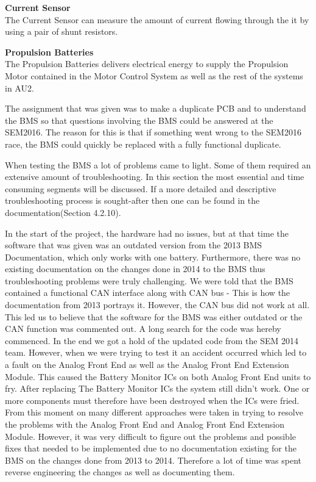 \textbf{Current Sensor}\\
The Current Sensor can measure the amount of current flowing through the it by using a pair of shunt resistors. 

\textbf{Propulsion Batteries}\\
The Propulsion Batteries delivers electrical energy to supply the Propulsion Motor contained in the Motor Control System as well as the rest of the systems in AU2.


The assignment that was given was to make a duplicate PCB and to understand the BMS so that questions involving the BMS could be answered at the SEM2016. The reason for this is that if something went wrong to the SEM2016 race, the BMS could quickly be replaced with a fully functional duplicate.

When testing the BMS a lot of problems came to light. Some of them required an extensive amount of troubleshooting. In this section the most essential and time consuming segments will be discussed. If a more detailed and descriptive troubleshooting process is sought-after then one can be found in the documentation\cite{AU2}(Section 4.2.10).

In the start of the project, the hardware had no issues, but at that time the software that was given was an outdated version from the 2013 BMS Documentation\cite{BMSDocumentation}, which only works with one battery. Furthermore, there was no existing documentation on the changes done in 2014 to the BMS thus troubleshooting problems were truly challenging.
We were told that the BMS contained a functional CAN interface along with CAN bus - This is how the documentation from 2013 portrays it. However, the CAN bus did not work at all. This led us to believe that the software for the BMS was either outdated or the CAN function was commented out. A long search for the code was hereby commenced. In the end we got a hold of the updated code from the SEM 2014 team. However, when we were trying to test it an accident occurred which led to a fault on the Analog Front End as well as the Analog Front End Extension Module. This caused the Battery Monitor ICs on both Analog Front End units to fry.
After replacing The Battery Monitor ICs the system still didn't work. One or more components must therefore have been destroyed when the ICs were fried. From this moment on many different approaches were taken in trying to resolve the problems with the Analog Front End and Analog Front End Extension Module. However, it was very difficult to figure out the problems and possible fixes that needed to be implemented due to no documentation existing for the BMS on the changes done from 2013 to 2014. Therefore a lot of time was spent reverse engineering the changes as well as documenting them. 

